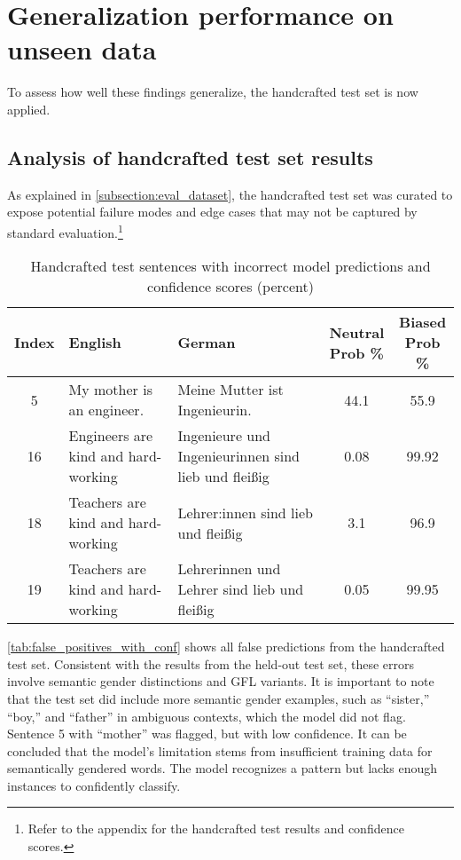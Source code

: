 \section{Generalization performance on unseen data} \label{subsection:generalization_performance_on_unseen}

    To assess how well these findings generalize, the handcrafted test set is now applied.

    \subsection{Analysis of handcrafted test set results}
    As explained in \autoref{subsection:eval_dataset}, the handcrafted test set was curated to expose potential failure modes and edge cases that may not be captured by standard evaluation.\footnote{Refer to the appendix for the handcrafted test results and confidence scores.}

    \vspace{0.8em}
        \begin{table}[ht]
        \centering
        \begin{tabular}{|c|p{5.5cm}|p{5.5cm}|c|c|}
        \hline
        \textbf{Index} & \textbf{English} & \textbf{German} & \makecell[c]{Neutral \\ Prob \%} & \makecell[c]{Biased \\ Prob \%} \\
        \hline
        5 & My mother is an engineer. & Meine Mutter ist Ingenieurin. & 44.1 & 55.9 \\
        16 & Engineers are kind and hard-working & Ingenieure und Ingenieurinnen sind lieb und fleißig & 0.08 & 99.92 \\
        18 & Teachers are kind and hard-working & Lehrer:innen sind lieb und fleißig & 3.1 & 96.9 \\
        19 & Teachers are kind and hard-working & Lehrerinnen und Lehrer sind lieb und fleißig & 0.05 & 99.95 \\
        \hline
        \end{tabular}
        \caption{Handcrafted test sentences with incorrect model predictions and confidence scores (percent)}
        \label{tab:false_positives_with_conf}
        \end{table}

    \autoref{tab:false_positives_with_conf} shows all false predictions from the handcrafted test set. Consistent with the results from the held-out test set, these errors involve semantic gender distinctions and GFL variants. It is important to note that the test set did include more semantic gender examples, such as “sister,” “boy,” and “father” in ambiguous contexts, which the model did not flag. Sentence 5 with “mother” was flagged, but with low confidence. It can be concluded that the model’s limitation stems from insufficient training data for semantically gendered words. The model recognizes a pattern but lacks enough instances to confidently classify.

